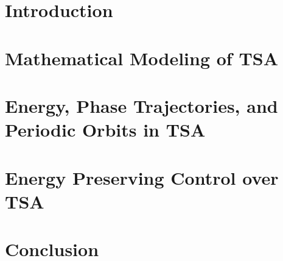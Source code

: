 \section{Introduction}


\section{Mathematical Modeling of TSA}
\label{modeling}


\section{Energy, Phase Trajectories, and Periodic Orbits in TSA}
\label{orbits}


\section{Energy Preserving Control over TSA}
\label{control}


\section{Conclusion}
\label{conclusion}

